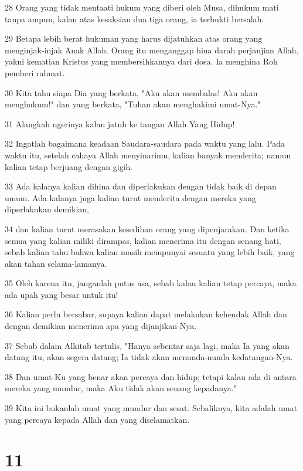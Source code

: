 \par 28 Orang yang tidak mentaati hukum yang diberi oleh Musa, dihukum mati tanpa ampun, kalau atas kesaksian dua tiga orang, ia terbukti bersalah.
\par 29 Betapa lebih berat hukuman yang harus dijatuhkan atas orang yang menginjak-injak Anak Allah. Orang itu menganggap hina darah perjanjian Allah, yakni kematian Kristus yang membersihkannya dari dosa. Ia menghina Roh pemberi rahmat.
\par 30 Kita tahu siapa Dia yang berkata, "Aku akan membalas! Aku akan menghukum!" dan yang berkata, "Tuhan akan menghakimi umat-Nya."
\par 31 Alangkah ngerinya kalau jatuh ke tangan Allah Yang Hidup!
\par 32 Ingatlah bagaimana keadaan Saudara-saudara pada waktu yang lalu. Pada waktu itu, setelah cahaya Allah menyinarimu, kalian banyak menderita; namun kalian tetap berjuang dengan gigih.
\par 33 Ada kalanya kalian dihina dan diperlakukan dengan tidak baik di depan umum. Ada kalanya juga kalian turut menderita dengan mereka yang diperlakukan demikian,
\par 34 dan kalian turut merasakan kesedihan orang yang dipenjarakan. Dan ketika semua yang kalian miliki dirampas, kalian menerima itu dengan senang hati, sebab kalian tahu bahwa kalian masih mempunyai sesuatu yang lebih baik, yang akan tahan selama-lamanya.
\par 35 Oleh karena itu, janganlah putus asa, sebab kalau kalian tetap percaya, maka ada upah yang besar untuk itu!
\par 36 Kalian perlu bersabar, supaya kalian dapat melakukan kehendak Allah dan dengan demikian menerima apa yang dijanjikan-Nya.
\par 37 Sebab dalam Alkitab tertulis, "Hanya sebentar saja lagi, maka Ia yang akan datang itu, akan segera datang; Ia tidak akan menunda-nunda kedatangan-Nya.
\par 38 Dan umat-Ku yang benar akan percaya dan hidup; tetapi kalau ada di antara mereka yang mundur, maka Aku tidak akan senang kepadanya."
\par 39 Kita ini bukanlah umat yang mundur dan sesat. Sebaliknya, kita adalah umat yang percaya kepada Allah dan yang diselamatkan.

\chapter{11}

